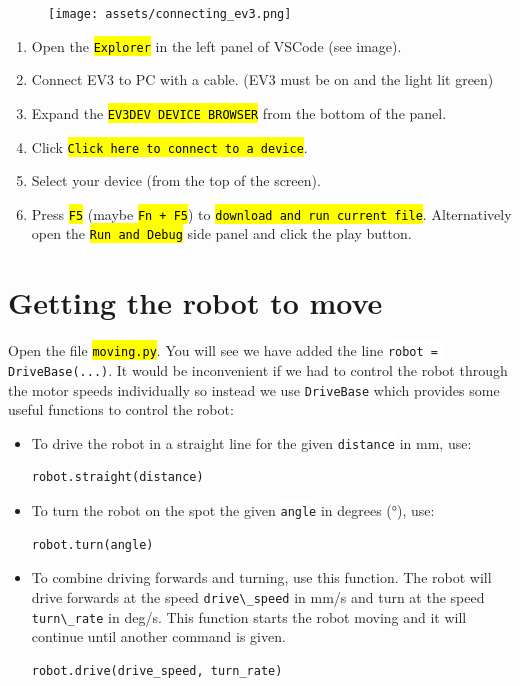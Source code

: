 \documentclass[12pt,a4paper]{article}
\newcommand{\vb}[1]{\hl{\texttt{#1}}} %
\newcommand{\code}[1]{\colorbox{background}{\lstinline[style=moving]{#1}}} %
\begin{document}
\begin{figure}[h]
    \centering
    \texttt{[image: assets/connecting\_ev3.png]}
\end{figure}

\begin{enumerate}
    \item Open the \vb{Explorer} in the left panel of VSCode (see image). 
    \item Connect EV3 to PC with a cable. (EV3 must be on and the light lit green) 
    \item Expand the \vb{EV3DEV DEVICE BROWSER} from the bottom of the panel. 
    \item Click \vb{Click here to connect to a device}. 
    \item Select your device (from the top of the screen). 
    \item Press \vb{F5} (maybe \vb{Fn + F5}) to \vb{download and run current file}. Alternatively open the \vb{Run and Debug} side panel and click the play button. 
\end{enumerate}



\section*{Getting the robot to move}
Open the file \vb{moving.py}. You will see we have added the line \code{robot = DriveBase(...)}. It would be inconvenient if we had to control the robot through the motor speeds individually so instead we use \code{DriveBase} which provides some useful functions to control the robot:

\begin{itemize}
\item To drive the robot in a straight line for the given \code{distance} in mm, use:
\begin{lstlisting}[style=moving]
robot.straight(distance)
\end{lstlisting}

\item To turn the robot on the spot the given \code{angle} in degrees (°), use:
\begin{lstlisting}[style=moving]
robot.turn(angle)
\end{lstlisting}

\item To combine driving forwards and turning, use this function. The robot will drive forwards at the speed \code{drive\_speed} in mm/s and turn at the speed \code{turn\_rate} in deg/s. This function starts the robot moving and it will continue until another command is given.
\begin{lstlisting}[style=moving]
robot.drive(drive_speed, turn_rate)
\end{lstlisting}
\end{itemize}
\end{document}
